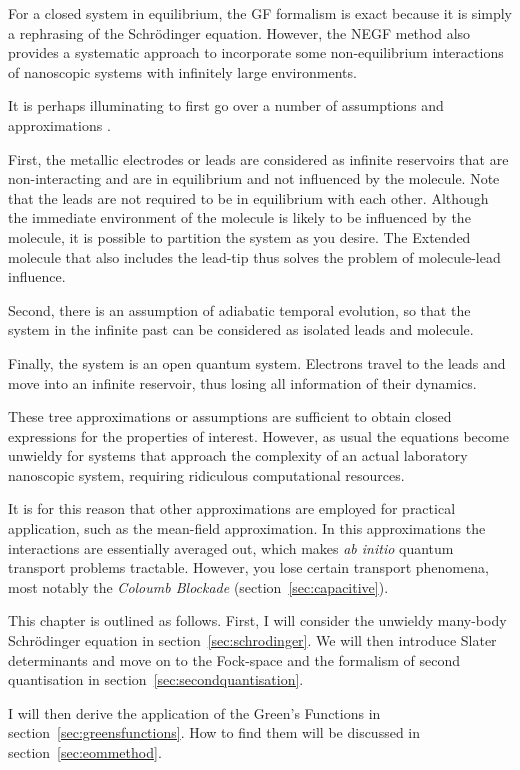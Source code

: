 For a closed system in equilibrium, the GF formalism is exact because it is simply a rephrasing of the Schr\"odinger equation. However, the NEGF method also provides a systematic approach to incorporate some non-equilibrium interactions of nanoscopic systems with infinitely large environments.

It is perhaps illuminating to first go over a number of assumptions and approximations \cite{seldenthuis}. 

First, the metallic electrodes or leads are considered as infinite reservoirs that are non-interacting and are in equilibrium and not influenced by the molecule. Note that the leads are not required to be in equilibrium with each other. Although the immediate environment of the molecule is likely to be influenced by the molecule, it is possible to partition the system as you desire. The Extended molecule that also includes the lead-tip thus solves the problem of molecule-lead influence.

Second, there is an assumption of adiabatic temporal evolution, so that the system in the infinite past can be considered as isolated leads and molecule.  

Finally, the system is an open quantum system. Electrons travel to the leads and move into an infinite reservoir, thus losing all information of their dynamics. 

These tree approximations or assumptions are sufficient to obtain closed expressions for the properties of interest. However, as usual the equations become unwieldy for systems that approach the complexity of an actual laboratory nanoscopic system, requiring ridiculous computational resources.

It is for this reason that other approximations are employed for practical application, such as the mean-field approximation. In this approximations the interactions are essentially averaged out, which makes \emph{ab initio} quantum transport problems tractable. However, you lose certain transport phenomena, most notably the \emph{Coloumb Blockade} (section~\ref{sec:capacitive}).

This chapter is outlined as follows. First, I will consider the unwieldy many-body Schr\"odinger equation in section~\ref{sec:schrodinger}. We will then introduce Slater determinants and move on to the Fock-space and the formalism of second quantisation in section~\ref{sec:secondquantisation}. 

I will then derive the application of the Green's Functions in section~\ref{sec:greensfunctions}. How to find them will be discussed in section~\ref{sec:eommethod}.


